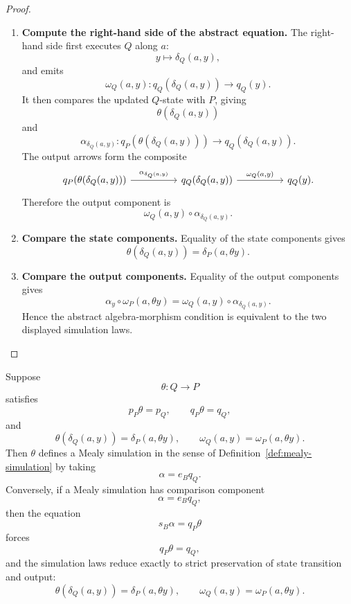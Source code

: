 \begin{proof}
\begin{enumerate}
        \item \textbf{Compute the right-hand side of the abstract equation.} The right-hand side first executes \(Q\) along \(a\):
        \[
            y
            \longmapsto
            \delta_Q(a,y),
        \]
        and emits
        \[
            \omega_Q(a,y):q_Q(\delta_Q(a,y))\to q_Q(y).
        \]
        It then compares the updated \(Q\)-state with \(P\), giving
        \[
            \theta(\delta_Q(a,y))
        \]
        and
        \[
            \alpha_{\delta_Q(a,y)}:
            q_P(\theta(\delta_Q(a,y)))\to q_Q(\delta_Q(a,y)).
        \]
        The output arrows form the composite
        \[
            \begin{tikzcd}[column sep=huge]
                    {q_P(\theta(\delta_Q(a,y)))}
                        \arrow[r, "{\alpha_{\delta_Q(a,y)}}"]
                &
                    {q_Q(\delta_Q(a,y))}
                        \arrow[r, "{\omega_Q(a,y)}"]
                &
                    {q_Q(y)}.
            \end{tikzcd}
        \]
        Therefore the output component is
        \[
            \omega_Q(a,y)\circ\alpha_{\delta_Q(a,y)}.
        \]

        \item \textbf{Compare the state components.} Equality of the state components gives
        \[
            \theta(\delta_Q(a,y))
            =
            \delta_P(a,\theta y).
        \]

        \item \textbf{Compare the output components.} Equality of the output components gives
        \[
            \alpha_y\circ \omega_P(a,\theta y)
            =
            \omega_Q(a,y)\circ \alpha_{\delta_Q(a,y)}.
        \]
        Hence the abstract algebra-morphism condition is equivalent to the two displayed simulation laws.
    \end{enumerate}
\end{proof}

\begin{remark}
\label{rem:strict-mealy-simulations}
    Suppose
    \[
        \theta:Q\to P
    \]
    satisfies
    \[
        p_P\theta=p_Q,
        \qquad
        q_P\theta=q_Q,
    \]
    and
    \[
        \theta(\delta_Q(a,y))=\delta_P(a,\theta y),
        \qquad
        \omega_Q(a,y)=\omega_P(a,\theta y).
    \]
    Then \(\theta\) defines a Mealy simulation in the sense of Definition~\ref{def:mealy-simulation} by taking
    \[
        \alpha=e_Bq_Q.
    \]
    Conversely, if a Mealy simulation has comparison component
    \[
        \alpha=e_Bq_Q,
    \]
    then the equation
    \[
        s_B\alpha=q_P\theta
    \]
    forces
    \[
        q_P\theta=q_Q,
    \]
    and the simulation laws reduce exactly to strict preservation of state transition and output:
    \[
        \theta(\delta_Q(a,y))=\delta_P(a,\theta y),
        \qquad
        \omega_Q(a,y)=\omega_P(a,\theta y).
    \]
\end{remark}

